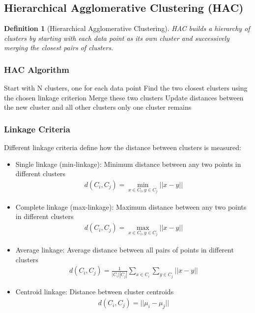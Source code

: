 \documentclass{article}
\newtheorem{definition}{Definition}
\begin{document}
\subsection{Hierarchical Agglomerative Clustering (HAC)}
\begin{definition}[Hierarchical Agglomerative Clustering]
HAC builds a hierarchy of clusters by starting with each data point as its own cluster and successively merging the closest pairs of clusters.
\end{definition}

\subsubsection{HAC Algorithm}
\begin{algorithm}
\caption{Hierarchical Agglomerative Clustering}
\begin{algorithmic}[1]
\State Start with N clusters, one for each data point
\Repeat
\State Find the two closest clusters using the chosen linkage criterion
\State Merge these two clusters
\State Update distances between the new cluster and all other clusters
\Until only one cluster remains
\end{algorithmic}
\end{algorithm}

\subsubsection{Linkage Criteria}
Different linkage criteria define how the distance between clusters is measured:
\begin{itemize}
\item Single linkage (min-linkage): Minimum distance between any two points in different clusters
\begin{align}
d(C_i, C_j) = \min_{x \in C_i, y \in C_j}||x - y||
\end{align}
\item Complete linkage (max-linkage): Maximum distance between any two points in different clusters
\begin{align}
d(C_i, C_j) = \max_{x \in C_i, y \in C_j}||x - y||
\end{align}
\item Average linkage: Average distance between all pairs of points in different clusters
\begin{align}
d(C_i, C_j) = \frac{1}{|C_i||C_j|}\sum_{x \in C_i}\sum_{y \in C_j}||x - y||
\end{align}
\item Centroid linkage: Distance between cluster centroids
\begin{align}
d(C_i, C_j) = ||\mu_i - \mu_j||
\end{align}
\end{itemize}
\end{document}
